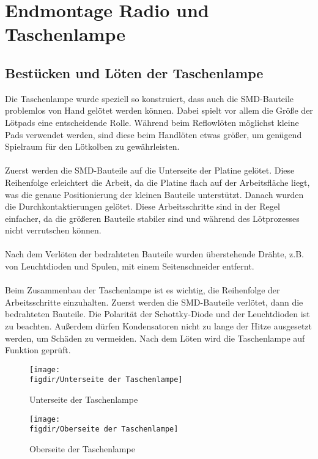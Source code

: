 \section{Endmontage Radio und Taschenlampe}

\subsection{Bestücken und Löten der Taschenlampe}
Die Taschenlampe wurde speziell so konstruiert, dass auch die SMD-Bauteile problemlos von Hand gelötet werden können.
Dabei spielt vor allem die Größe der Lötpads eine entscheidende Rolle.
Während beim Reflowlöten möglichst kleine Pads verwendet werden, sind diese beim Handlöten etwas größer, um genügend Spielraum für den Lötkolben zu gewährleisten.\\
\\
Zuerst werden die SMD-Bauteile auf die Unterseite der Platine gelötet.
Diese Reihenfolge erleichtert die Arbeit, da die Platine flach auf der Arbeitsfläche liegt, was die genaue Positionierung der kleinen Bauteile unterstützt.
Danach wurden die Durchkontaktierungen gelötet.
Diese Arbeitsschritte sind in der Regel einfacher, da die größeren Bauteile stabiler sind und während des Lötprozesses nicht verrutschen können.\\
\\
Nach dem Verlöten der bedrahteten Bauteile wurden überstehende Drähte, z.B. von Leuchtdioden und Spulen, mit einem Seitenschneider entfernt.\\
\\
Beim Zusammenbau der Taschenlampe ist es wichtig, die Reihenfolge der Arbeitsschritte einzuhalten. Zuerst werden die SMD-Bauteile verlötet, dann die bedrahteten Bauteile.
Die Polarität der Schottky-Diode und der Leuchtdioden ist zu beachten.
Außerdem dürfen Kondensatoren nicht zu lange der Hitze ausgesetzt werden, um Schäden zu vermeiden. Nach dem Löten wird die Taschenlampe auf Funktion geprüft.

\begin{figure}[h!]
    \centering
    \texttt{[image: \\figdir/Unterseite der Taschenlampe]}
    \caption{Unterseite der Taschenlampe}
    \label{fig: Abbildung 11}
\end{figure}

\begin{figure}[h!]
    \centering
    \texttt{[image: \\figdir/Oberseite der Taschenlampe]}
    \caption{Oberseite der Taschenlampe}
    \label{fig:fig: Abbildung 12}
\end{figure}

